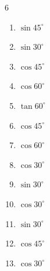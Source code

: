 \begin{multicols}{6}
\begin{enumerate}
\columnbreak %

  \item $\displaystyle \sin{45^\circ}$


  \item $\displaystyle \sin{30^\circ}$


  \item $\displaystyle \cos{45^\circ}$


  \item $\displaystyle \cos{60^\circ}$


  \item $\displaystyle \tan{60^\circ}$


  \item $\displaystyle \cos{45^\circ}$


  \item $\displaystyle \cos{60^\circ}$


  \item $\displaystyle \cos{30^\circ}$


  \item $\displaystyle \sin{30^\circ}$


  \item $\displaystyle \cos{30^\circ}$


  \item $\displaystyle \sin{30^\circ}$


  \item $\displaystyle \cos{45^\circ}$


  \item $\displaystyle \cos{30^\circ}$


\end{enumerate}
\end{multicols}
